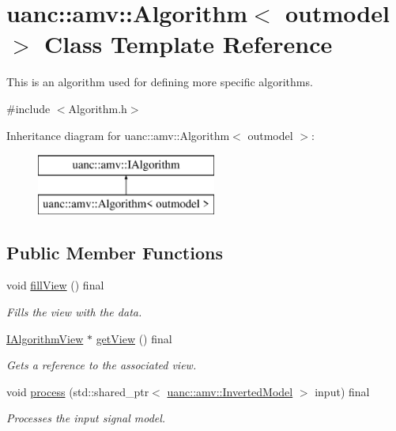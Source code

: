 \hypertarget{classuanc_1_1amv_1_1_algorithm}{}\section{uanc\+:\+:amv\+:\+:Algorithm$<$ outmodel $>$ Class Template Reference}
\label{classuanc_1_1amv_1_1_algorithm}


This is an algorithm used for defining more specific algorithms.  




{\ttfamily \#include $<$Algorithm.\+h$>$}

Inheritance diagram for uanc\+:\+:amv\+:\+:Algorithm$<$ outmodel $>$\+:\begin{figure}[H]
\begin{center}
\leavevmode
\includegraphics[height=2.000000cm]{classuanc_1_1amv_1_1_algorithm}
\end{center}
\end{figure}
\subsection*{Public Member Functions}
\begin{DoxyCompactItemize}
\item 
void \hyperlink{classuanc_1_1amv_1_1_algorithm_ab85377888f8a0a242803e8ec0dc31db6}{fill\+View} () final
\begin{DoxyCompactList}\small\item\em Fills the view with the data. \end{DoxyCompactList}\item 
\hyperlink{classuanc_1_1amv_1_1_i_algorithm_view}{I\+Algorithm\+View} $\ast$ \hyperlink{classuanc_1_1amv_1_1_algorithm_af0fb55f30a278f0f44427ff690c96fc7}{get\+View} () final
\begin{DoxyCompactList}\small\item\em Gets a reference to the associated view. \end{DoxyCompactList}\item 
void \hyperlink{classuanc_1_1amv_1_1_algorithm_a0af524c2f170204c5c60b2561f286570}{process} (std\+::shared\+\_\+ptr$<$ \hyperlink{classuanc_1_1amv_1_1_inverted_model}{uanc\+::amv\+::\+Inverted\+Model} $>$ input) final
\begin{DoxyCompactList}\small\item\em Processes the input signal model. \end{DoxyCompactList}\end{DoxyCompactItemize}
